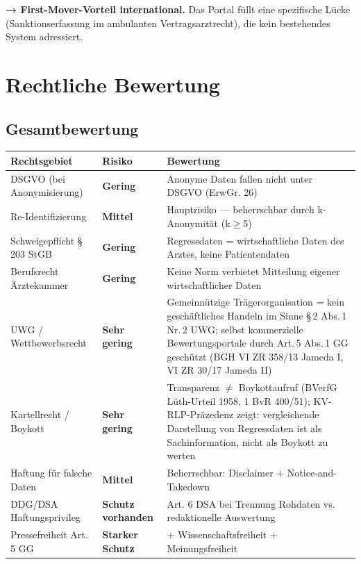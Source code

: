 \documentclass{umbruch-position}
\begin{document}
\textbf{→ First-Mover-Vorteil international.} Das Portal füllt eine spezifische Lücke (Sanktionserfassung im ambulanten Vertragsarztrecht), die kein bestehendes System adressiert.


\section{Rechtliche Bewertung}

\subsection{Gesamtbewertung}

{\small
\begin{tabularx}{\textwidth}{X X X}
\toprule
\textbf{Rechtsgebiet} & \textbf{Risiko} & \textbf{Bewertung} \\
\midrule
DSGVO (bei Anonymisierung) & \textbf{Gering} & Anonyme Daten fallen nicht unter DSGVO (ErwGr. 26) \\
Re-Identifizierung & \textbf{Mittel} & Hauptrisiko — beherrschbar durch k-Anonymität (k$\ge$5) \\
Schweigepflicht § 203 StGB & \textbf{Gering} & Regressdaten = wirtschaftliche Daten des Arztes, keine Patientendaten \\
Berufsrecht Ärztekammer & \textbf{Gering} & Keine Norm verbietet Mitteilung eigener wirtschaftlicher Daten \\
UWG / Wettbewerbsrecht & \textbf{Sehr gering} & Gemeinnützige Trägerorganisation = kein geschäftliches Handeln im Sinne \S\,2 Abs.\,1 Nr.\,2 UWG; selbst kommerzielle Bewertungsportale durch Art.\,5 Abs.\,1 GG geschützt (BGH VI ZR 358/13 Jameda I, VI ZR 30/17 Jameda II) \\
Kartellrecht / Boykott & \textbf{Sehr gering} & Transparenz $\neq$ Boykottaufruf (BVerfG Lüth-Urteil 1958, 1 BvR 400/51); KV-RLP-Präzedenz zeigt: vergleichende Darstellung von Regressdaten ist als Sachinformation, nicht als Boykott zu werten \\
Haftung für falsche Daten & \textbf{Mittel} & Beherrschbar: Disclaimer + Notice-and-Takedown \\
DDG/DSA Haftungsprivileg & \textbf{Schutz vorhanden} & Art. 6 DSA bei Trennung Rohdaten vs. redaktionelle Auswertung \\
Pressefreiheit Art. 5 GG & \textbf{Starker Schutz} & + Wissenschaftsfreiheit + Meinungsfreiheit \\
\bottomrule
\end{tabularx}
}
\end{document}
